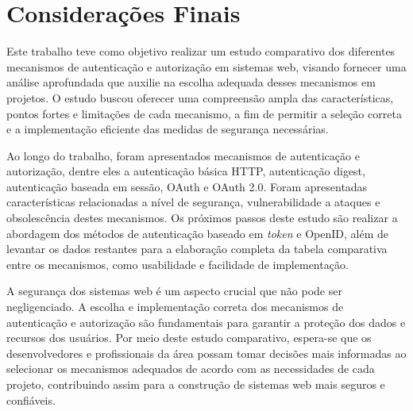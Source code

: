 \section{Considerações Finais}

Este trabalho teve como objetivo realizar um estudo comparativo dos diferentes mecanismos de 
autenticação e autorização em sistemas web, visando fornecer uma análise aprofundada que auxilie na 
escolha adequada desses mecanismos em projetos. O estudo buscou oferecer uma compreensão ampla das 
características, pontos fortes e limitações de cada mecanismo, a fim de permitir a seleção correta 
e a implementação eficiente das medidas de segurança necessárias.

Ao longo do trabalho, foram apresentados mecanismos de autenticação e autorização, dentre eles a 
autenticação básica HTTP, autenticação digest, autenticação baseada em sessão, OAuth e OAuth 2.0.
Foram apresentadas características relacionadas a nível de segurança, vulnerabilidade a ataques e 
obsolescência destes mecanismos. Os próximos passos deste estudo são realizar a abordagem dos 
métodos de autenticação baseado em \emph{token} e OpenID, além de levantar os dados restantes para 
a elaboração completa da tabela comparativa entre os mecanismos, como usabilidade e facilidade de 
implementação.

A segurança dos sistemas web é um aspecto crucial que não pode ser negligenciado. A escolha e 
implementação correta dos mecanismos de autenticação e autorização são fundamentais para garantir 
a proteção dos dados e recursos dos usuários. Por meio deste estudo comparativo, espera-se que os 
desenvolvedores e profissionais da área possam tomar decisões mais informadas ao selecionar os 
mecanismos adequados de acordo com as necessidades de cada projeto, contribuindo assim para a 
construção de sistemas web mais seguros e confiáveis.
